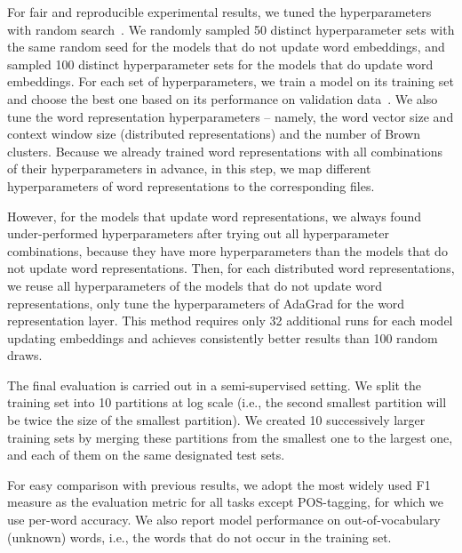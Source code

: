 For fair and reproducible experimental results, we tuned the hyperparameters with random search~\cite{bergstra2012random}. 
We randomly sampled 50 distinct hyperparameter sets with the same random seed for the models that do not update word embeddings, and sampled 100 distinct hyperparameter sets for the models that do update word embeddings. 
For each set of hyperparameters, we train a model on its training set and choose the best one based on its performance on validation data~\cite{turian2010word}. 
We also tune the word representation hyperparameters -- namely, the word vector size and context window size (distributed representations) and the number of Brown clusters. Because we already trained word representations with all combinations of their hyperparameters in advance, in this step, we map different hyperparameters of word representations to the corresponding files. 

However, for the models that update word representations, we always found under-performed hyperparameters after trying out all hyperparameter combinations, because they have more hyperparameters than the models that do not update word representations. Then, for each distributed word representations, we reuse all hyperparameters of the models that do not update word representations, only tune the hyperparameters of AdaGrad for the word representation layer. This method requires only 32 additional runs for each model updating embeddings and achieves consistently better results than 100 random draws.

The final evaluation is carried out in a semi-supervised setting. We split the training set into 10 partitions at log scale (i.e., the second smallest partition will be twice the size of the smallest partition). We created 10 successively larger training sets by merging these partitions from the smallest one to the largest one, and  each of them on the same designated test sets. 

For easy comparison with previous results, we adopt the most widely used F1 measure as the evaluation metric for all tasks except POS-tagging, for which we use per-word accuracy. We also report model performance on out-of-vocabulary (unknown) words, i.e., the words that do not occur in the training set.


